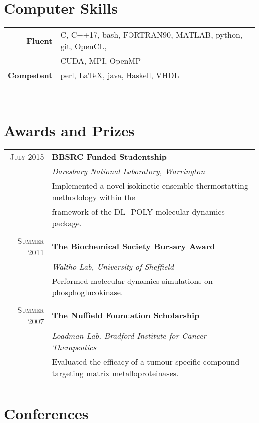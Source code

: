 \documentclass[11pt]{article} %
\begin{document}
\section{Computer Skills} 

\begin{tabular}{rl}
\textbf{Fluent}
&C, C++17, bash, \textsc{FORTRAN90}, MATLAB, python, git, OpenCL,\\ 
&CUDA, MPI, OpenMP\\ 
\textbf{Competent}
& perl, \LaTeX, java, Haskell, VHDL\\
\end{tabular}
\\

\newpage

\section{Awards and Prizes} 
\begin{tabular}{rl}

\textsc{July 2015} & \large{\textbf{BBSRC Funded Studentship}}\\
& \textit{Daresbury National Laboratory, Warrington}\\
& Implemented a novel isokinetic ensemble thermostatting methodology within the\\ &framework of the DL\_POLY molecular dynamics package.\\
\\

\textsc{Summer 2011} & \large{\textbf{The Biochemical Society Bursary Award}}\\
& \textit{Waltho Lab, University of Sheffield}\\
& Performed molecular dynamics simulations on phosphoglucokinase.\\
\\

\textsc{Summer 2007} & \large{\textbf{The Nuffield Foundation Scholarship}}\\
& \textit{Loadman Lab, Bradford Institute for Cancer Therapeutics}\\
& Evaluated the efficacy of a tumour-specific compound targeting matrix metalloproteinases.\\
\\

\end{tabular}

\section{Conferences}
\end{document}
